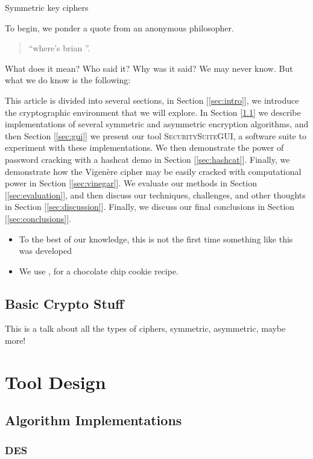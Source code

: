 \documentclass[acmlarge]{acmart}
\begin{document}
Symmetric key ciphers

To begin, we ponder a quote from an anonymous philosopher.
\begin{quote}
  ``where's brian ''.
\end{quote}
What does it mean? Who said it? Why was it said? We may never know. But what we do know is the following:

This article is divided into several sections, in Section [\ref{sec:intro}], we introduce the cryptographic environment that we will explore. In Section [\ref{sec:algorithms}] we describe implementations of several symmetric and asymmetric encryption algorithms, and then Section [\ref{sec:gui}] we present our tool \textsc{SecuritySuiteGUI}, a software suite to experiment with these implementations. We then demonstrate the power of password cracking with a hashcat demo in Section [\ref{sec:hashcat}]. Finally, we demonstrate how the Vigenère cipher may be easily cracked with computational power in Section [\ref{sec:vinegar}]. We evaluate our methods in Section [\ref{sec:evaluation}], and then discuss our techniques, challenges, and other thoughts in Section [\ref{sec:discussion}]. Finally, we discuss our final conclusions in Section [\ref{sec:conclusions}].

\begin{itemize}
\item To the best of our knowledge, this is not the first time something like this was developed
\item We use \cite{Adya-01}, for a chocolate chip cookie recipe.
\end{itemize}

\subsection{Basic Crypto Stuff}

This is a talk about all the types of ciphers, symmetric, asymmetric, maybe more!

\section{Tool Design} \label{sec:impl}
\subsection{Algorithm Implementations} \label{sec:algorithms}

\subsubsection{DES}
\end{document}
